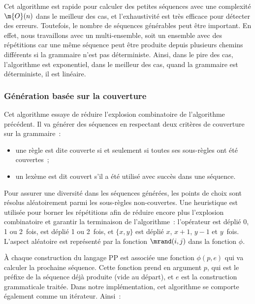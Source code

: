 Cet algorithme est rapide pour calculer des petites séquences avec une
complexité $\m{O}(n)$ dans le meilleur des cas, et l'exhaustivité est très
efficace pour détecter des erreurs. Toutefois, le nombre de séquences générables
peut être important. En effet, nous travaillons avec un multi-ensemble, soit un
ensemble avec des répétitions car une même séquence peut être produite depuis
plusieurs chemins différents si la grammaire n'est pas déterministe. Ainsi, dans
le pire des cas, l'algorithme est exponentiel, dans le meilleur des cas, quand
la grammaire est déterministe, il est linéaire.

\subsubsection{Génération basée sur la couverture}
\label{subsection:data:coverage_based_generation}

Cet algorithme essaye de réduire l'explosion combinatoire de l'algorithme
précédent. Il va générer des séquences en respectant deux critères de
couverture sur la grammaire~:
%
\begin{itemize}

\item une règle est dite couverte si et seulement si toutes ses sous-règles ont
été couvertes~;

\item un lexème est dit couvert s'il a été utilisé avec succès dans une
séquence.

\end{itemize}
%
Pour assurer une diversité dans les séquences générées, les points de choix sont
résolus aléatoirement parmi les sous-règles non-couvertes. Une heuristique est
utilisée pour borner les répétitions afin de réduire encore plus l'explosion
combinatoire et garantir la terminaison de l'algorithme~: l'opérateur \code{*}
est déplié 0, 1 ou 2~fois, \code{+} est déplié 1 ou 2~fois, et $\{x, y\}$ est
déplié $x$, $x + 1$, $y - 1$ et $y$~fois. L'aspect aléatoire est représenté par
la fonction $\mrand(i, j)$ dans la fonction $\phi$.

À chaque construction du langage PP est associée une fonction $\phi(p, e)$ qui
va calculer la prochaine séquence. Cette fonction prend en argument $p$, qui est
le préfixe de la séquence déjà produite (vide au départ), et $e$ est la
construction grammaticale traitée. Dans notre implémentation, cet algorithme se
comporte également comme un itérateur. Ainsi~:

